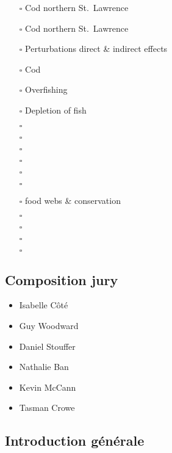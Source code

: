 \begin{itemize}
\tightlist
\item[$\square$]
  \citet{bousquet2019} Cod northern St.~Lawrence
\item[$\square$]
  \citet{bundy2005} Cod northern St.~Lawrence
\item[$\square$]
  \citet{burns2014} Perturbations direct \& indirect effects
\item[$\square$]
  \citet{frank2005} Cod
\item[$\square$]
  \citet{jackson2001} Overfishing
\item[$\square$]
  \citet{myers2003} Depletion of fish
\item[$\square$]
  \citet{ogorman2009}
\item[$\square$]
  \citet{ogorman2010}
\item[$\square$]
  \citet{ogorman2012}
\item[$\square$]
  \citet{ogorman2019}
\item[$\square$]
  \citet{worm2002}
\item[$\square$]
  \citet{zhang2019}
\item[$\square$]
  \citet{mcdonaldmadden2016} food webs \& conservation
\item[$\square$]
  \citet{abdalaroberts2019}
\item[$\square$]
  \citet{gillaranz2016}
\item[$\square$]
  \citet{gillaranz2017}
\item[$\square$]
  \citet{dupontavice2019}
\end{itemize}

\hypertarget{composition-jury}{%
\subsection*{Composition jury}\label{composition-jury}}

\begin{itemize}
\tightlist
\item
  Isabelle Côté
\item
  Guy Woodward
\item
  Daniel Stouffer
\item
  Nathalie Ban
\item
  Kevin McCann
\item
  Tasman Crowe
\end{itemize}

\hypertarget{introduction-guxe9nuxe9rale}{%
\subsection*{Introduction générale}\label{introduction-guxe9nuxe9rale}}

